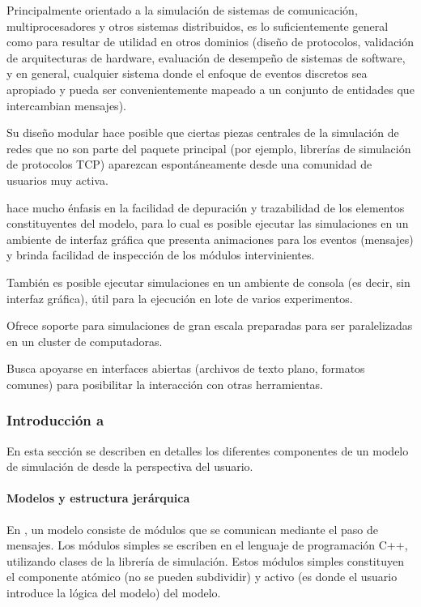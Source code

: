 \documentclass[]{article}
\begin{document}
Principalmente orientado a la simulación de sistemas de comunicación,
multiprocesadores y otros sistemas distribuidos, \omnetpp{} es lo suficientemente
general como para resultar de utilidad en otros dominios (diseño de protocolos,
validación de arquitecturas de hardware, evaluación de desempeño de sistemas de
software, y en general, cualquier sistema donde el enfoque de eventos discretos
sea apropiado y pueda ser convenientemente mapeado a un conjunto de entidades
que intercambian mensajes).

Su diseño modular hace posible que ciertas piezas centrales de la simulación de
redes que no son parte del paquete principal (por ejemplo, librerías de
simulación de protocolos TCP) aparezcan espontáneamente desde una comunidad de
usuarios muy activa.

\omnetpp{} hace mucho énfasis en la facilidad de depuración y trazabilidad de
los elementos constituyentes del modelo, para lo cual es posible ejecutar las
simulaciones en un ambiente de interfaz gráfica que presenta animaciones para
los eventos (mensajes) y brinda facilidad de inspección de los módulos
intervinientes.

También es posible ejecutar simulaciones en un ambiente de consola (es decir,
sin interfaz gráfica), útil para la ejecución en lote de varios experimentos.

Ofrece soporte para simulaciones de gran escala preparadas para ser
paralelizadas en un cluster de computadoras.

Busca apoyarse en interfaces abiertas (archivos de texto plano, formatos
comunes) para posibilitar la interacción con otras herramientas.

\subsubsection{Introducción a \omnetpp{}}

En esta sección se describen en detalles los diferentes componentes de un
modelo de simulación de \omnetpp{} desde la perspectiva del usuario.

\paragraph{Modelos y estructura jerárquica}

En \omnetpp{}, un modelo consiste de módulos que se comunican mediante el paso de
mensajes. Los módulos simples se escriben en el lenguaje de programación C++,
utilizando clases de la librería de simulación. Estos módulos simples
constituyen el componente atómico (no se pueden subdividir) y activo (es donde
el usuario introduce la lógica del modelo) del modelo.
\end{document}
